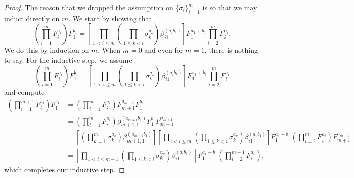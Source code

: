 \documentclass{article}
\numberwithin{equation}{section}
\begin{document}
\begin{proof}
	The reason that we dropped the assumption on $\{\sigma_i\}_{i=1}^m$ is so that we may induct directly on $m$. We start by showing that
	\[\left(\prod_{i=1}^mF_i^{a_i}\right)F_1^{b_1}=\left[\prod_{1<i\le m}\left(\prod_{1\le k<i}\sigma_k^{a_k}\right)\beta_{i1}^{(a_ib_1)}\right]F_1^{a_1+b_1}\prod_{i=2}^mF_i^{a_i}.\]
	We do this by induction on $m$. When $m=0$ and even for $m=1$, there is nothing to say. For the inductive step, we assume
	\[\left(\prod_{i=1}^mF_i^{a_i}\right)F_1^{b_1}=\left[\prod_{1<i\le m}\left(\prod_{1\le k<i}\sigma_k^{a_k}\right)\beta_{i1}^{(a_ib_1)}\right]F_1^{a_1+b_1}\prod_{i=2}^mF_i^{a_i}\]
	and compute
	\begin{align*}
		\left(\prod_{i=1}^{m+1}F_i^{a_i}\right)F_1^{b_1} &= \left(\prod_{i=1}^{m}F_i^{a_i}\right)F_{m+1}^{a_{m+1}}F_1^{b_1} \\
		&= \left(\prod_{i=1}^{m}F_i^{a_i}\right)\beta_{m+1,1}^{(a_{m+1}b_1)}F_1^{b_1}F_{m+1}^{a_{m+1}} \\
		&= \left[\left(\prod_{k=1}^m\sigma_k^{a_k}\right)\beta_{m+1,1}^{(a_{m+1}b_1)}\right]\left[\prod_{1<i\le m}\left(\prod_{1\le k<i}\sigma_k^{a_k}\right)\beta_{i1}^{(a_ib_1)}\right]F_1^{a_1+b_1}\left(\prod_{i=2}^mF_i^{a_i}\right)F_{m+1}^{a_{m+1}} \\
		&= \left[\prod_{1<i\le m+1}\left(\prod_{1\le k<i}\sigma_k^{a_k}\right)\beta_{i1}^{(a_ib_1)}\right]F_1^{a_1+b_1}\left(\prod_{i=2}^{m+1}F_i^{a_i}\right),
	\end{align*}
	which completes our inductive step.


\end{proof}
\end{document}
